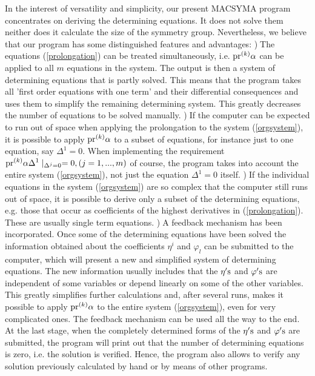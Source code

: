 {\nopagebreak
In the interest of versatility and simplicity, our present MACSYMA program 
concentrates on deriving the determining equations. It does not solve them 
neither does it calculate the size of the symmetry group.
Nevertheless, we believe that our program has some distinguished features 
and advantages:
\nopagebreak
\vskip 1pt
)$\;$The equations (\ref{prolongation}) can be treated simultaneously,
i.e. ${\rm pr}^{(k)} \alpha $ can be applied to all $m$ equations 
in the system.
The output is then a system of determining equations that is partly solved.
This means that the program takes all 'first order equations with one term'
and their differential consequences and uses them to
simplify the remaining determining system. This greatly decreases the
number of equations to be solved manually.
\nopagebreak
\vskip 1pt
)$\;$If the computer can be expected to run out of space when applying the
prolongation to the system (\ref{orgsystem}), it is possible to apply
${\rm pr}^{(k)} \alpha $ to a subset of equations, for instance just to
one equation, say $ \Delta^{1} = 0 .$ When implementing the requirement
$\displaystyle {\rm pr}^{(k)} \alpha \Delta^1 \mid_{\Delta^j = 0} = 0 ,
(j=1,...,m)$  of course, the program takes into account the entire 
system (\ref{orgsystem}), not just the equation  $ \Delta^{1} = 0 $ itself. 
\nopagebreak
\vskip 1pt
)$\;$If the individual equations in the system (\ref{orgsystem})
are so complex that the computer still runs out of space, it is possible
to derive only a subset of the determining equations, e.g. those that
occur as coefficients of the highest derivatives in (\ref{prolongation}).
These are usually single term equations.
\nopagebreak
\vskip 1pt
)$\;$A feedback mechanism has been incorporated. Once some of the 
determining equations have been solved the information obtained about the 
coefficients $\eta^i $ and $ \varphi_l$ can be submitted to the computer, 
which will present a new and simplified system of determining equations. 
The new information 
usually includes that the $\eta {\rm 's} $ and $ \varphi {\rm 's}$ are 
independent of some variables or depend linearly on some of the 
other variables. This greatly simplifies further calculations and, 
after several runs, makes it possible to apply 
${\rm pr}^{(k)} \alpha $ to the entire system 
(\ref{orgsystem}), even for very complicated ones. The feedback 
mechanism can be used all the way to the end.
At the last stage, when the completely determined forms of the
$\eta {\rm 's} $ and $ \varphi {\rm 's}$ are submitted,
the program will print out that the number of determining equations is zero,
i.e. the solution is verified. Hence, the program also allows to verify
any solution previously calculated by hand or by means of other programs.

}
